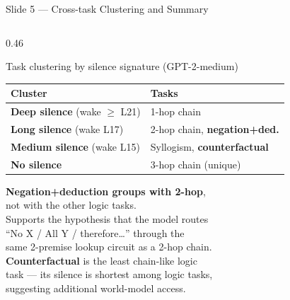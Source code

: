 \documentclass[aspectratio=169,10pt]{beamer}
\newcommand{\hi}[1] {\textcolor{attnred}{\textbf{#1}}}
\begin{document}
\begin{frame}{Slide 5 — Cross-task Clustering and Summary}

\begin{columns}[T]

\begin{column}{0.46\textwidth}
\begin{block}{Task clustering by silence signature (GPT-2-medium)}
\footnotesize
\begin{tabular}{ll}
\toprule
Cluster & Tasks \\
\midrule
\textbf{Deep silence} (wake $\geq$ L21) & 1-hop chain \\
\textbf{Long silence} (wake L17)         & 2-hop chain, \hi{negation+ded.} \\
\textbf{Medium silence} (wake L15)       & Syllogism, \hi{counterfactual} \\
\textbf{No silence}                      & 3-hop chain (unique) \\
\bottomrule
\end{tabular}

\medskip
\textbf{Negation+deduction groups with 2-hop},\\
not with the other logic tasks.\\
Supports the hypothesis that the model routes\\
``No X / All Y / therefore\dots'' through the\\
same 2-premise lookup circuit as a 2-hop chain.\\[6pt]
\textbf{Counterfactual} is the least chain-like logic\\
task — its silence is shortest among logic tasks,\\
suggesting additional world-model access.
\end{block}
\end{column}


\end{columns}
\end{frame}
\end{document}
